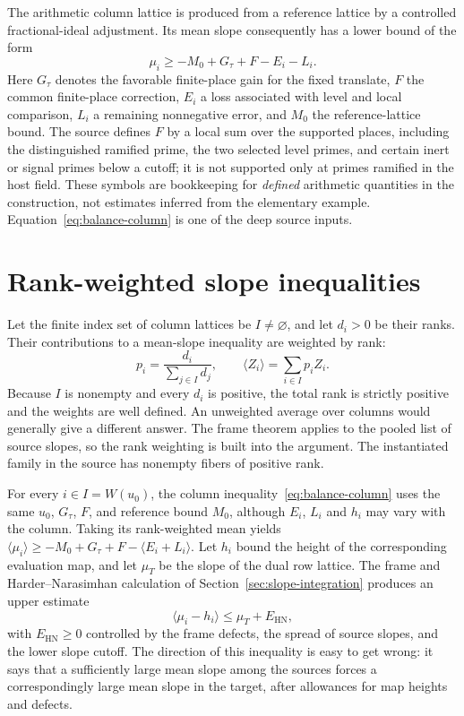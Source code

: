 \documentclass[11pt,openany,oneside]{scrbook}
\theoremstyle{definition}
\theoremstyle{remark}
\begin{document}
The arithmetic column lattice is produced from a reference lattice by a controlled fractional-ideal adjustment.  Its mean slope consequently has a lower bound of the form
\begin{equation}\label{eq:balance-column}
\mu_i\ge -M_0+G_\tau+F-E_i-L_i.
\end{equation}
Here $G_\tau$ denotes the favorable finite-place gain for the fixed translate, $F$ the common finite-place correction, $E_i$ a loss associated with level and local comparison, $L_i$ a remaining nonnegative error, and $M_0$ the reference-lattice bound.  The source defines $F$ by a local sum over the supported places, including the distinguished ramified prime, the two selected level primes, and certain inert or signal primes below a cutoff; it is not supported only at primes ramified in the host field.  These symbols are bookkeeping for \emph{defined} arithmetic quantities in the construction, not estimates inferred from the elementary example.  Equation~\eqref{eq:balance-column} is one of the deep source inputs.

\section{Rank-weighted slope inequalities}\label{sec:balance-family}

Let the finite index set of column lattices be $I\ne\varnothing$, and let $d_i>0$ be their ranks.  Their contributions to a mean-slope inequality are weighted by rank:
\[
p_i=\frac{d_i}{\sum_{j\in I}d_j},\qquad
\langle Z_i\rangle=\sum_{i\in I}p_iZ_i.
\]
Because $I$ is nonempty and every $d_i$ is positive, the total rank is strictly positive and the weights are well defined.  An unweighted average over columns would generally give a different answer.  The frame theorem applies to the pooled list of source slopes, so the rank weighting is built into the argument.  The instantiated family in the source has nonempty fibers of positive rank.

For every $i\in I=W(u_0)$, the column inequality~\eqref{eq:balance-column} uses the same $u_0$, $G_\tau$, $F$, and reference bound $M_0$, although $E_i$, $L_i$ and $h_i$ may vary with the column. Taking its rank-weighted mean yields $\langle\mu_i\rangle\ge -M_0+G_\tau+F-\langle E_i+L_i\rangle$. Let $h_i$ bound the height of the corresponding evaluation map, and let $\mu_T$ be the slope of the dual row lattice.  The frame and Harder--Narasimhan calculation of Section~\ref{sec:slope-integration} produces an upper estimate
\begin{equation}\label{eq:balance-transfer}
\langle\mu_i-h_i\rangle\le\mu_T+E_{\mathrm{HN}},
\end{equation}
with $E_{\mathrm{HN}}\ge0$ controlled by the frame defects, the spread of source slopes, and the lower slope cutoff.  The direction of this inequality is easy to get wrong: it says that a sufficiently large mean slope among the sources forces a correspondingly large mean slope in the target, after allowances for map heights and defects.
\end{document}
